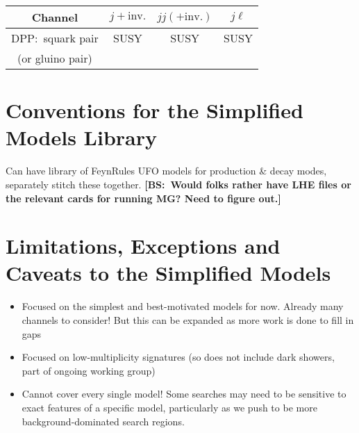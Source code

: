 \begin{center}
\begin{tabular}{ |c|c|c|c|} 
 \hline
Channel & $j+\mathrm{inv.}$ &  $jj(+\mathrm{inv.})$ & $j\ell$ \\
\hline\hline
DPP:~squark pair & SUSY & SUSY & SUSY \\
(or gluino pair) & & &\\
\hline
\end{tabular}
\end{center}

\section{Conventions for the Simplified Models Library}
Can have library of FeynRules UFO models for production \& decay modes, separately stitch these together. {\bf [BS:~Would folks rather have LHE files or the relevant cards for running MG? Need to figure out.]}

\section{Limitations, Exceptions and Caveats to the Simplified Models}
\begin{itemize}
\item Focused on the simplest and best-motivated models for now. Already many channels to consider! But this can be expanded as more work is done to fill in gaps
\item Focused on low-multiplicity signatures (so does not include dark showers, part of ongoing working group)
\item Cannot cover every single model! Some searches may need to be sensitive to exact features of a specific model, particularly as we push to be more background-dominated search regions.
\end{itemize}
